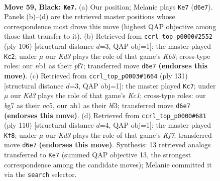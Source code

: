 \documentclass[11pt]{article}
\begin{document}
\clearpage

\begin{figure}[p]\centering
\begin{subfigure}{0.46\textwidth}\centering
\resizebox{\linewidth}{!}{%
\newchessgame
\chessboard[
  setfen={8/6B1/p2k4/8/2p3b1/8/5K2/1N6 b - - 17 59},
  showmover=false,
  pgfstyle=straightmove, color=movearrow, markmove={d6-e7}
]}
\caption{}
\end{subfigure}\hfill
\begin{subfigure}{0.46\textwidth}\centering
\resizebox{\linewidth}{!}{%
\newchessgame
\chessboard[
  setfen={8/5p2/5B2/3k4/8/1K6/3b1PP1/8 w - - 5 54},
  showmover=false,
  pgfstyle=straightmove, color=movearrow, markmove={b3-c2}
]}
\caption{}
\end{subfigure}
\\[4pt]
\begin{subfigure}{0.46\textwidth}\centering
\resizebox{\linewidth}{!}{%
\newchessgame
\chessboard[
  setfen={2k5/8/8/2N1K1p1/8/5B2/8/1b6 b - - 16 66},
  showmover=false,
  pgfstyle=straightmove, color=movearrow, markmove={c8-c7}
]}
\caption{}
\end{subfigure}\hfill
\begin{subfigure}{0.46\textwidth}\centering
\resizebox{\linewidth}{!}{%
\newchessgame
\chessboard[
  setfen={3b4/3P1K2/p7/8/8/k7/8/3B4 w - - 0 56},
  showmover=false,
  pgfstyle=straightmove, color=movearrow, markmove={f7-f8}
]}
\caption{}
\end{subfigure}
\caption{\textbf{Move 59, Black: \texttt{Ke7}.} (a) Our position; Melanie plays \texttt{Ke7} (\texttt{d6e7}). Panels (b)--(d) are the retrieved master positions whose correspondence most drove this move (highest QAP objective among those that transfer to it). (b) Retrieved from \texttt{ccrl\_top\_p0000\#2552} (ply 106) [structural distance $d$=3, QAP obj=1]: the master played \texttt{Kc2}; under $\mu$ our \emph{Kd3} plays the role of that game's \emph{Kb3}; cross-type roles: our \emph{n}b1 as their \emph{p}f7; transferred move \texttt{d6e7} \textbf{(endorses this move)}. (c) Retrieved from \texttt{ccrl\_top\_p0003\#1664} (ply 131) [structural distance $d$=3, QAP obj=1]: the master played \texttt{Kc7}; under $\mu$ our \emph{Kd3} plays the role of that game's \emph{Kc1}; cross-type roles: our \emph{b}g7 as their \emph{n}c5, our \emph{n}b1 as their \emph{b}f3; transferred move \texttt{d6e7} \textbf{(endorses this move)}. (d) Retrieved from \texttt{ccrl\_top\_p0000\#681} (ply 110) [structural distance $d$=4, QAP obj=1]: the master played \texttt{Kf8}; under $\mu$ our \emph{Kd3} plays the role of that game's \emph{Kf7}; transferred move \texttt{d6e7} \textbf{(endorses this move)}. Synthesis: 13 retrieved analogs transferred to \texttt{Ke7} (summed QAP objective 13, the strongest correspondence among the candidate moves); Melanie committed it via the \texttt{search} selector.}
\label{fig:thought-m117}
\end{figure}
\end{document}
